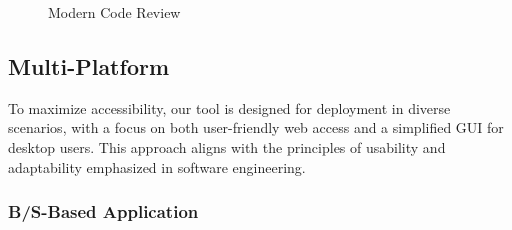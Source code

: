 \documentclass[journal]{IEEEtran}
\begin{document}
\begin{figure}[h]
  \centering
{}
  \hfill
{}
  \hfill
{}
\caption{Modern Code Review}
\label{fig:mcr} 
\end{figure}

\subsection{Multi-Platform}

To maximize accessibility, our tool is designed for deployment in diverse scenarios, with a focus on both user-friendly web access and a simplified GUI for desktop users. This approach aligns with the principles of usability and adaptability emphasized in software engineering.

\subsubsection{B/S-Based Application}
\end{document}
